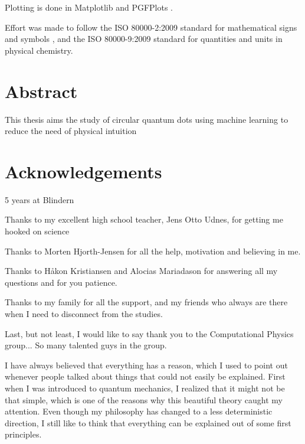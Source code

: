 Plotting is done in Matplotlib \cite{hunter_matplotlib:_2007} and PGFPlots \cite{tantau_graph_2013}. 

Effort was made to follow the ISO 80000-2:2009 standard for mathematical signs and symbols \cite{iso/tc_12_iso_nodate}, and the ISO 80000-9:2009 standard for quantities and units in physical chemistry\cite{iso/tc_12_iso_nodate-1}. 
\newpage
\section*{Abstract}
This thesis aims the study of circular quantum dots using machine learning to reduce the need of physical intuition

\thispagestyle{empty}
\cleardoublepage

\section*{Acknowledgements}
5 years at Blindern

Thanks to my excellent high school teacher, Jens Otto Udnes, for getting me hooked on science

Thanks to Morten Hjorth-Jensen for all the help, motivation and believing in me.

Thanks to Håkon Kristiansen and Alocias Mariadason for answering all my questions and for you patience. 

Thanks to my family for all the support, and my friends who always are there when I need to disconnect from the studies. 

Last, but not least, I would like to say thank you to the Computational Physics group... So many talented guys in the group. 

I have always believed that everything has a reason, which I used to point out whenever people talked about things that could not easily be explained. First when I was introduced to quantum mechanics, I realized that it might not be that simple, which is one of the reasons why this beautiful theory caught my attention. Even though my philosophy has changed to a less deterministic direction, I still like to think that everything can be explained out of some first principles. 
    
\thispagestyle{empty}
\cleardoublepage

{%
    \tableofcontents
    \thispagestyle{empty}
    \clearpage}%

\thispagestyle{empty}
\clearpage


